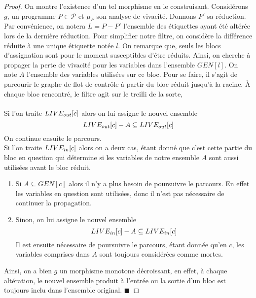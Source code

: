 \documentclass[a4paper, 12pt]{article}
\begin{document}
\begin{proof}
	On montre l'existence d'un tel morphisme en le construisant. Considérons $g$, un programme $P \in \mathcal{P}$ et $\mu_P$ son analyse
	de vivacité. Donnons $P'$ sa réduction. Par convénience, on notera $L = P - P'$ l'ensemble des étiquettes
	ayant été altérée lors de la dernière réduction. Pour simplifier notre filtre, on considère la différence réduite à une unique étiquette notée $l$.
	On remarque que, seuls les blocs d'assignation sont pour le moment susceptibles d'être réduits. Ainsi, on cherche à propager la perte de vivacité pour les variables
	dans l'ensemble $GEN[l]$. On note $A$ l'ensemble des variables utilisées sur ce bloc. Pour se faire, il s'agit de parcourir le graphe de flot de contrôle
	à partir du bloc réduit jusqu'à la racine. À chaque bloc rencontré, le filtre agit sur le treilli de la sorte,
	\\
	\\
	Si l'on traite $LIVE_{out}[c]$ alors on lui assigne le nouvel ensemble 
	\[LIVE_{out}[c] - A \subseteq LIVE_{out}[c]\] 
	On continue ensuite le parcours.
	\\
	Si l'on traite $LIVE_{in}[c]$ alors on a deux cas, étant donné que c'est cette partie du bloc en question qui détermine si les variables
	de notre ensemble $A$ sont aussi utilisées avant le bloc réduit.
	\begin{enumerate}
		\item Si $A \subseteq GEN[c]$ alors il n'y a plus besoin de poursuivre le parcours. En effet les variables en question sont utilisées, donc il n'est pas nécessaire
		de continuer la propagation.\\
		\item Sinon, on lui assigne le nouvel ensemble
		\[LIVE_{in}[c] - A \subseteq LIVE_{in}[c]\]
		Il est ensuite nécessaire de poursuivre le parcours, étant donnée qu'en $c$, les variables comprises dans $A$ sont toujours considérées comme mortes.
	\end{enumerate}
	Ainsi, on a bien $g$ un morphisme monotone décroissant, en effet, à chaque altération, le nouvel ensemble produit à l'entrée ou la sortie d'un bloc est toujours
	inclu dans l'ensemble original.
	\hfill $\blacksquare$
\end{proof}
\end{document}
